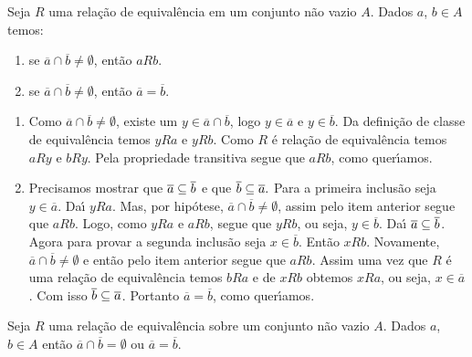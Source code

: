 \begin{proposicao}
    Seja $R$ uma rela{\c c}{\~a}o de equival{\^e}ncia em um conjunto n{\~a}o vazio $A$. Dados $a$, $b \in A$ temos:
    \begin{enumerate}[label={\roman*})]
        \item se $\overline{a} \cap \overline{b} \ne \emptyset$, ent{\~a}o $aRb$.
        \item se  $\overline{a} \cap \overline{b} \neq \emptyset$, ent{\~a}o $\overline{a} = \overline{b}$.
    \end{enumerate}
\end{proposicao}
\begin{prova}
    \begin{enumerate}[label={\roman*})]
        \item Como  $\overline{a} \cap \overline{b} \ne \emptyset$, existe um $y \in \overline{a} \cap \overline{b}$, logo $y \in \overline{a}$ e $y \in \overline{b}$. Da defini{\c c}{\~a}o de classe de equival{\^e}ncia temos $yRa$ e $yRb$. Como $R$ {\'e} rela{\c c}{\~a}o de equival{\^e}ncia temos $aRy$ e $bRy$. Pela propriedade transitiva segue que $aRb$, como quer{\'\i}amos.

        \item Precisamos mostrar que $\overline{a} \subseteq \overline{b}$ e que $\overline{b} \subseteq \overline{a}.$ Para a primeira inclus\~ao seja $y \in \overline{a}$. Da{\'\i} $yRa$. Mas, por hip\'otese, $\overline{a}\cap\overline{b}\neq\emptyset$, assim pelo item anterior segue que $aRb$. Logo, como $yRa$ e $aRb$, segue que $yRb$, ou seja, $y \in \overline{b}$. Da{\'\i} $\overline{a}\subseteq\overline{b}$. Agora para provar a segunda inclus\~ao seja $x \in \overline{b}$. Ent\~ao $xRb$. Novamente, $\overline{a} \cap \overline{b} \ne \emptyset$ e ent\~ao pelo item anterior segue que $aRb$. Assim uma vez que $R$ \'e uma rela\c{c}\~ao de equival\^encia temos $bRa$ e de $xRb$ obtemos $xRa$, ou seja, $x \in \overline{a}$. Com isso $\overline{b} \subseteq \overline{a}$. Portanto $\overline{a} = \overline{b}$, como quer{\'\i}amos.
    \end{enumerate}
\end{prova}

\begin{corolario}
    Seja $R$ uma rela\c{c}\~ao de equival\^encia sobre um conjunto n\~ao vazio $A$. Dados $a$, $b \in A$ ent\~ao $\overline{a} \cap \overline{b} = \emptyset$ ou $\overline{a} = \overline{b}$.
\end{corolario}

